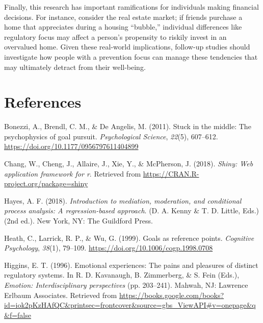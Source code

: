 \documentclass[man,floatsintext]{apa6}
\begin{document}
Finally, this research has important ramifications for individuals making financial decisions. For instance, consider the real estate market; if friends purchase a home that appreciates during a housing \enquote{bubble,} individual differences like regulatory focus may affect a person's propensity to riskily invest in an overvalued home. Given these real-world implications, follow-up studies should investigate how people with a prevention focus can manage these tendencies that may ultimately detract from their well-being.

\newpage

\hypertarget{references}{%
\section{References}\label{references}}

\begingroup
\setlength{\parindent}{-0.5in}
\setlength{\leftskip}{0.5in}

\hypertarget{refs}{}
\leavevmode\hypertarget{ref-bonezzietal2011}{}%
Bonezzi, A., Brendl, C. M., \& De Angelis, M. (2011). Stuck in the middle: The psychophysics of goal pursuit. \emph{Psychological Science}, \emph{22}(5), 607--612. \url{https://doi.org/10.1177/0956797611404899}

\leavevmode\hypertarget{ref-R-shiny}{}%
Chang, W., Cheng, J., Allaire, J., Xie, Y., \& McPherson, J. (2018). \emph{Shiny: Web application framework for r}. Retrieved from \url{https://CRAN.R-project.org/package=shiny}

\leavevmode\hypertarget{ref-hayes2018}{}%
Hayes, A. F. (2018). \emph{Introduction to mediation, moderation, and conditional process analysis: A regression-based approach}. (D. A. Kenny \& T. D. Little, Eds.) (2nd ed.). New York, NY: The Guildford Press.

\leavevmode\hypertarget{ref-heathetal1999}{}%
Heath, C., Larrick, R. P., \& Wu, G. (1999). Goals as reference points. \emph{Cognitive Psychology}, \emph{38}(1), 79--109. \url{https://doi.org/10.1006/cogp.1998.0708}

\leavevmode\hypertarget{ref-higgins1996d}{}%
Higgins, E. T. (1996). Emotional experiences: The pains and pleasures of distinct regulatory systems. In R. D. Kavanaugh, B. Zimmerberg, \& S. Fein (Eds.), \emph{Emotion: Interdisciplinary perspectives} (pp. 203--241). Mahwah, NJ: Lawrence Erlbaum Associates. Retrieved from \url{https://books.google.com/books?id=iok2pKzHAfQC\&printsec=frontcover\&source=gbs_ViewAPI\#v=onepage\&q\&f=false}
\end{document}
